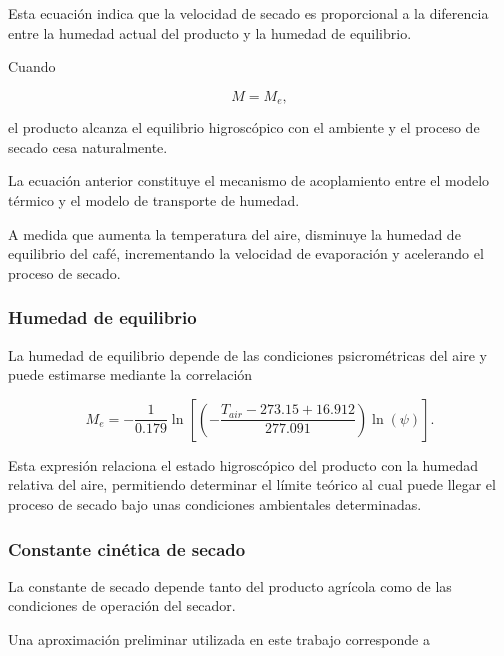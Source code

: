 Esta ecuación indica que la velocidad de secado es proporcional a la diferencia entre la humedad actual del producto y la humedad de equilibrio.

Cuando

\[
M=M_e,
\]

el producto alcanza el equilibrio higroscópico con el ambiente y el proceso de secado cesa naturalmente.

\begin{tcolorbox}[title=Interpretación física,colback=yellow!5,colframe=orange!70!black]

La ecuación anterior constituye el mecanismo de acoplamiento entre el modelo térmico y el modelo de transporte de humedad.

A medida que aumenta la temperatura del aire, disminuye la humedad de equilibrio del café, incrementando la velocidad de evaporación y acelerando el proceso de secado.

\end{tcolorbox}

\subsubsection{Humedad de equilibrio}

La humedad de equilibrio depende de las condiciones psicrométricas del aire y puede estimarse mediante la correlación

\begin{equation}
M_e=
-\frac{1}{0.179}
\ln
\left[
\left(
-\frac{T_{air}-273.15+16.912}{277.091}
\right)
\ln(\psi)
\right].
\end{equation}

Esta expresión relaciona el estado higroscópico del producto con la humedad relativa del aire, permitiendo determinar el límite teórico al cual puede llegar el proceso de secado bajo unas condiciones ambientales determinadas.

\subsubsection{Constante cinética de secado}

La constante de secado depende tanto del producto agrícola como de las condiciones de operación del secador.

Una aproximación preliminar utilizada en este trabajo corresponde a

